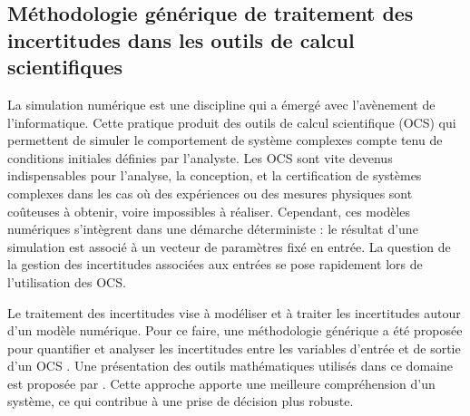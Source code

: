 \subsection*{Méthodologie générique de traitement des incertitudes dans les outils de calcul scientifiques}

La simulation numérique est une discipline qui a émergé avec l'avènement de l'informatique. 
Cette pratique produit des outils de calcul scientifique (OCS) qui permettent de simuler le comportement de système complexes compte tenu de conditions initiales définies par l'analyste. 
Les OCS sont vite devenus indispensables pour l'analyse, la conception, et la certification de systèmes complexes dans les cas o\`u des expériences ou des mesures physiques sont coûteuses à obtenir, voire impossibles à réaliser. 
Cependant, ces modèles numériques s'intègrent dans une démarche déterministe : le résultat d'une simulation est associé à un vecteur de paramètres fixé en entrée. 
La question de la gestion des incertitudes associées aux entrées se pose rapidement lors de l'utilisation des OCS. 

Le traitement des incertitudes vise à modéliser et à traiter les incertitudes autour d'un modèle numérique. 
Pour ce faire, une méthodologie générique a été proposée pour quantifier et analyser les incertitudes entre les variables d'entrée et de sortie d'un OCS \citep{rocquigny_2008}. 
Une présentation des outils mathématiques utilisés dans ce domaine est proposée par \citet{sullivan_2015}.
Cette approche apporte une meilleure compréhension d'un système, ce qui contribue à une prise de décision plus robuste.   


